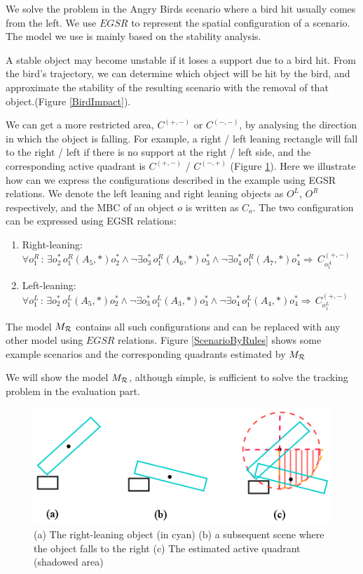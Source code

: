 \documentclass[letterpaper]{article}
\begin{document}
We solve the problem in the Angry Birds scenario where a bird hit usually comes from the left. We use $EGSR$ to represent the spatial configuration of a scenario. The model we use is mainly based on the stability analysis.


A stable object may become unstable if it loses a support due to a bird hit. From the bird's trajectory, we can determine which object will be hit by the bird, and approximate the stability of the resulting scenario with the removal of that object.(Figure \ref{BirdImpact}). 

We can get a more restricted area, $C^{(+,-)}$ or $C^{(-,-)}$, by analysing the direction in which the object is falling. For example, a right / left leaning rectangle will fall to the right / left if there is no support at the right / left side, and the corresponding active quadrant is $C^{(+,-)}$ / $C^{(-, +)}$ (Figure \ref{QudrantsEstimation}). Here we illustrate how can we express the configurations described in the example using EGSR relations. We denote the left leaning and right leaning objects as $O^L$, $O^R$ respectively, and the MBC of an object $o$ is written as $C_{o}$. The two configuration can be expressed using EGSR relations:
\begin{enumerate}
\item Right-leaning: $\forall o^R_1\,:\, \exists o^*_2\,o^R_1 (A_5, *) o^*_2 \wedge\neg\exists o^*_3\,o^R_1 (A_6, *) o^*_3 \wedge\neg\exists o^*_4\,o^R_1 (A_7, *) o^*_4 \Rightarrow \, C_{o^A_1}^{(+,-)}$

\item Left-leaning: $\forall o^L_1\,:\, \exists o^*_2\,o^L_1 (A_5, *) o^*_2 \wedge\neg\exists o^*_3\,o^L_1 (A_3, *) o^*_3 \wedge\neg\exists o^*_4\,o^L_1 (A_4, *) o^*_4 \Rightarrow \, C_{o^L_1}^{(+,-)}$
\end{enumerate}
The model $M_{\cal{R}}$ contains all such configurations and can be replaced with any other model using $EGSR$ relations. Figure \ref{ScenarioByRules} shows some example scenarios and the corresponding quadrants estimated by $M_{\cal{R}}$

 We will show the model $M_{\cal{R}}$, although simple, is sufficient to solve the tracking problem in the evaluation part.  


\begin{figure}[h!]
\centering\includegraphics[scale=0.35]{QudrantsEstimation.png}\caption{(a) The right-leaning object (in cyan)  (b) a subsequent scene where the object falls to the right (c) The estimated active quadrant (shadowed area)}
\label{QudrantsEstimation}
\end{figure}
\end{document}
